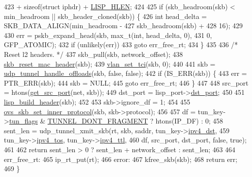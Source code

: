 \begin{DoxyCode}
423             + \textcolor{keyword}{sizeof}(\textcolor{keyword}{struct }iphdr) + \hyperlink{vport-lisp_8c_a432175729adc4f68dad362484b077981}{LISP\_HLEN};
424 
425     \textcolor{keywordflow}{if} (skb\_headroom(skb) < min\_headroom || skb\_header\_cloned(skb)) \{
426         \textcolor{keywordtype}{int} head\_delta = SKB\_DATA\_ALIGN(min\_headroom -
427                         skb\_headroom(skb) +
428                         16);
429 
430         err = pskb\_expand\_head(skb, max\_t(\textcolor{keywordtype}{int}, head\_delta, 0),
431                     0, GFP\_ATOMIC);
432         \textcolor{keywordflow}{if} (unlikely(err))
433             \textcolor{keywordflow}{goto} err\_free\_rt;
434     \}
435 
436     \textcolor{comment}{/* Reset l2 headers. */}
437     skb\_pull(skb, network\_offset);
438     \hyperlink{skbuff_8h_aaf81c26756757ac1e1d7e6933f61bdaf}{skb\_reset\_mac\_header}(skb);
439     \hyperlink{vlan_8h_ad5de1acaa10b947f662a8200417dd6c4}{vlan\_set\_tci}(skb, 0);
440 
441     skb = \hyperlink{udp__tunnel_8h_a2c093a62e766646df5cf62f8ea3aba91}{udp\_tunnel\_handle\_offloads}(skb, \textcolor{keyword}{false}, \textcolor{keyword}{false});
442     \textcolor{keywordflow}{if} (IS\_ERR(skb)) \{
443         err = PTR\_ERR(skb);
444         skb = NULL;
445         \textcolor{keywordflow}{goto} err\_free\_rt;
446     \}
447 
448     src\_port = htons(\hyperlink{vport-lisp_8c_a106a25589649bc37c3905cb00fb59f62}{get\_src\_port}(net, skb));
449     dst\_port = lisp\_port->\hyperlink{structlisp__port_a3f0943c0da5e5c60f9e8e4068d49215e}{dst\_port};
450 
451     \hyperlink{vport-lisp_8c_afacb726760b72b4d01c27f470d4b7a3a}{lisp\_build\_header}(skb);
452 
453     skb->ignore\_df = 1;
454 
455     \hyperlink{gso_8h_afa56bd287d4a10d09bf25d8219f574b5}{ovs\_skb\_set\_inner\_protocol}(skb, skb->protocol);
456 
457     df = tun\_key->\hyperlink{structovs__key__ipv4__tunnel_a7459e66ecf90329eb2fa6cf3fc4781db}{tun\_flags} & \hyperlink{ip__tunnels_8h_a3b33c8fadb48f2281d5852e2a0d8eeff}{TUNNEL\_DONT\_FRAGMENT} ? htons(IP\_DF) : 0;
458     sent\_len = udp\_tunnel\_xmit\_skb(rt, skb, saddr, tun\_key->\hyperlink{structovs__key__ipv4__tunnel_ae443d381a97f53bbc4139fe36c0aae30}{ipv4\_dst},
459                        tun\_key->\hyperlink{structovs__key__ipv4__tunnel_a69594eaf9d7dfc2824b264484e02498e}{ipv4\_tos}, tun\_key->\hyperlink{structovs__key__ipv4__tunnel_a24de7472a8c22903fce96b73dab68a40}{ipv4\_ttl},
460                        df, src\_port, dst\_port, \textcolor{keyword}{false}, \textcolor{keyword}{true});
461 
462     \textcolor{keywordflow}{return} sent\_len > 0 ? sent\_len + network\_offset : sent\_len;
463 
464 err\_free\_rt:
465     ip\_rt\_put(rt);
466 error:
467     kfree\_skb(skb);
468     \textcolor{keywordflow}{return} err;
469 \}
\end{DoxyCode}
\hypertarget{vport-lisp_8c_a91b2b04c344bf1a50d02d4084fabf482}{}
